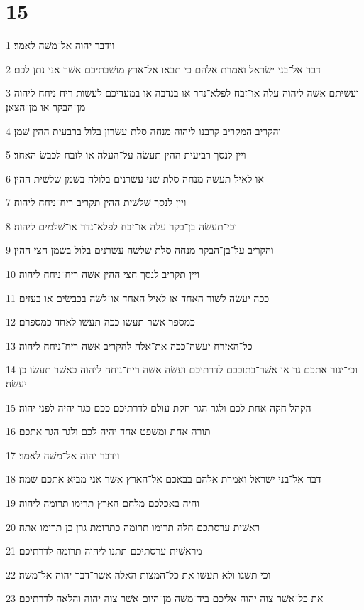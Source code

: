 \chapter{15}

\par 1 וידבר יהוה אל־משׁה לאמר׃
\par 2 דבר אל־בני ישׂראל ואמרת אלהם כי תבאו אל־ארץ מושׁבתיכם אשׁר אני נתן לכם׃
\par 3 ועשׂיתם אשׁה ליהוה עלה או־זבח לפלא־נדר או בנדבה או במעדיכם לעשׂות ריח ניחח ליהוה מן־הבקר או מן־הצאן׃
\par 4 והקריב המקריב קרבנו ליהוה מנחה סלת עשׂרון בלול ברבעית ההין שׁמן׃
\par 5 ויין לנסך רביעית ההין תעשׂה על־העלה או לזבח לכבשׂ האחד׃
\par 6 או לאיל תעשׂה מנחה סלת שׁני עשׂרנים בלולה בשׁמן שׁלשׁית ההין׃
\par 7 ויין לנסך שׁלשׁית ההין תקריב ריח־ניחח ליהוה׃
\par 8 וכי־תעשׂה בן־בקר עלה או־זבח לפלא־נדר או־שׁלמים ליהוה׃
\par 9 והקריב על־בן־הבקר מנחה סלת שׁלשׁה עשׂרנים בלול בשׁמן חצי ההין׃
\par 10 ויין תקריב לנסך חצי ההין אשׁה ריח־ניחח ליהוה׃
\par 11 ככה יעשׂה לשׁור האחד או לאיל האחד או־לשׂה בכבשׂים או בעזים׃
\par 12 כמספר אשׁר תעשׂו ככה תעשׂו לאחד כמספרם׃
\par 13 כל־האזרח יעשׂה־ככה את־אלה להקריב אשׁה ריח־ניחח ליהוה׃
\par 14 וכי־יגור אתכם גר או אשׁר־בתוככם לדרתיכם ועשׂה אשׁה ריח־ניחח ליהוה כאשׁר תעשׂו כן יעשׂה׃
\par 15 הקהל חקה אחת לכם ולגר הגר חקת עולם לדרתיכם ככם כגר יהיה לפני יהוה׃
\par 16 תורה אחת ומשׁפט אחד יהיה לכם ולגר הגר אתכם׃
\par 17 וידבר יהוה אל־משׁה לאמר׃
\par 18 דבר אל־בני ישׂראל ואמרת אלהם בבאכם אל־הארץ אשׁר אני מביא אתכם שׁמה׃
\par 19 והיה באכלכם מלחם הארץ תרימו תרומה ליהוה׃
\par 20 ראשׁית ערסתכם חלה תרימו תרומה כתרומת גרן כן תרימו אתה׃
\par 21 מראשׁית ערסתיכם תתנו ליהוה תרומה לדרתיכם׃
\par 22 וכי תשׁגו ולא תעשׂו את כל־המצות האלה אשׁר־דבר יהוה אל־משׁה׃
\par 23 את כל־אשׁר צוה יהוה אליכם ביד־משׁה מן־היום אשׁר צוה יהוה והלאה לדרתיכם׃
